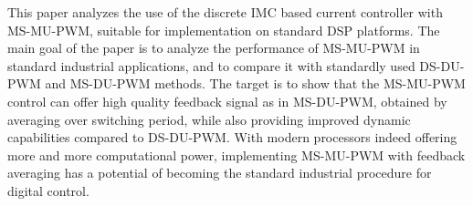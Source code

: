 \documentclass[journal]{IEEEtran}
\begin{document}
This paper analyzes the use of the discrete IMC based current controller with MS-MU-PWM, suitable for implementation on standard DSP platforms. The main goal of the paper is to analyze the performance of MS-MU-PWM in standard industrial applications, and to compare it with standardly used DS-DU-PWM and MS-DU-PWM methods. 
The target is to show that the MS-MU-PWM control can offer high quality feedback signal as in MS-DU-PWM, obtained by averaging over switching period, while also providing improved dynamic capabilities compared to DS-DU-PWM. With modern processors indeed offering more and more computational power, implementing MS-MU-PWM with feedback averaging has a potential of becoming the standard industrial procedure for digital control.

 
\end{document}
